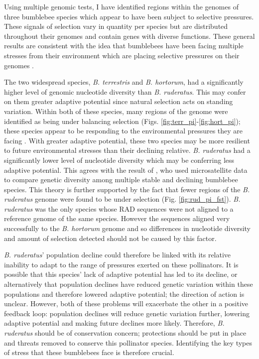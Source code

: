\documentclass[12pt]{article}
\begin{document}
\begin{linenumbers}
    

	Using multiple genomic tests, I have identified regions within the genomes of three bumblebee species which appear to have been subject to selective pressures. These signals of selection vary in quantity per species but are distributed throughout their genomes and contain genes with diverse functions. These general results are consistent with the idea that bumblebees have been facing multiple stresses from their environment which are placing selective pressures on their genomes \citep{potts_global_2010, outhwaite_agriculture_2022}. 
    	
    	
    The two widespread species, \emph{B. terrestris} and \emph{B. hortorum}, had a significantly higher level of genomic nucleotide diversity than \emph{B. ruderatus}. This may confer on them greater adaptive potential since natural selection acts on standing variation. Within both of these species, many regions of the genome were identified as being under balancing selection (Figs. \ref{fig:terr_pi}-\ref{fig:hort_pi}); these species appear to be responding to the environmental pressures they are facing \citep{colgan_genomic_2022}.
    With greater adaptive potential, these two species may be more resilient to future environmental stresses than their declining relative.
    \emph{B. ruderatus} had a significantly lower level of nucleotide diversity which may be conferring less adaptive potential. This agrees with the result of \cite{maebe_microsatellite_2015}, who used microsatellite data to compare genetic diversity among multiple stable and declining bumblebee species. This theory is further supported by the fact that fewer regions of the \emph{B. ruderatus} genome were found to be under selection (Fig. \ref{fig:rud_pi_fst}). 
	\emph{B. ruderatus} was the only species whose RAD sequences were not aligned to a reference genome of the same species. However the sequences aligned very successfully to the \emph{B. hortorum} genome and so differences in nucleotide diversity and amount of selection  detected should not be caused by this factor.
	

    \emph{B. ruderatus}' population decline could therefore be linked with its relative inability to adapt to the range of pressures exerted on these pollinators. It is possible that this species' lack of adaptive potential has led to its decline, or alternatively that population declines have reduced genetic variation within these populations and therefore lowered adaptive potential; the direction of action is unclear. However, both of these problems will exacerbate the other in a positive feedback loop: population declines will reduce genetic variation further, lowering adaptive potential and making future declines more likely. Therefore, \emph{B. ruderatus} should be of conservation concern; protections should be put in place and threats removed to conserve this pollinator species. Identifying the key types of stress that these bumblebees face is therefore crucial.
    	

\end{linenumbers}
\end{document}
